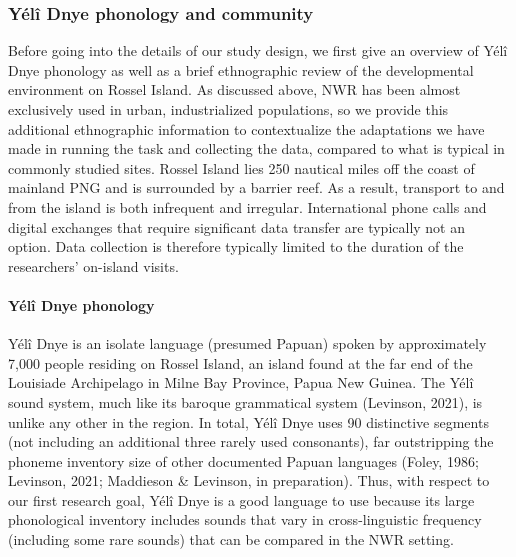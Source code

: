 \documentclass[
  english,
  ,man,floatsintext]{apa6}
\let\oldparagraph\paragraph
\renewcommand{\paragraph}[1]{\oldparagraph{#1}\mbox{}}
\begin{document}
\hypertarget{yuxe9luxee-dnye-phonology-and-community}{%
\subsubsection{Yélî Dnye phonology and community}\label{yuxe9luxee-dnye-phonology-and-community}}

Before going into the details of our study design, we first give an overview of Yélî Dnye phonology as well as a brief ethnographic review of the developmental environment on Rossel Island. As discussed above, NWR has been almost exclusively used in urban, industrialized populations, so we provide this additional ethnographic information to contextualize the adaptations we have made in running the task and collecting the data, compared to what is typical in commonly studied sites. Rossel Island lies 250 nautical miles off the coast of mainland PNG and is surrounded by a barrier reef. As a result, transport to and from the island is both infrequent and irregular. International phone calls and digital exchanges that require significant data transfer are typically not an option. Data collection is therefore typically limited to the duration of the researchers' on-island visits.

\hypertarget{yuxe9luxee-dnye-phonology}{%
\paragraph{Yélî Dnye phonology}\label{yuxe9luxee-dnye-phonology}}

Yélî Dnye is an isolate language (presumed Papuan) spoken by approximately 7,000 people residing on Rossel Island, an island found at the far end of the Louisiade Archipelago in Milne Bay Province, Papua New Guinea. The Yélî sound system, much like its baroque grammatical system (Levinson, 2021), is unlike any other in the region. In total, Yélî Dnye uses 90 distinctive segments (not including an additional three rarely used consonants), far outstripping the phoneme inventory size of other documented Papuan languages (Foley, 1986; Levinson, 2021; Maddieson \& Levinson, in preparation). Thus, with respect to our first research goal, Yélî Dnye is a good language to use because its large phonological inventory includes sounds that vary in cross-linguistic frequency (including some rare sounds) that can be compared in the NWR setting.
\end{document}
